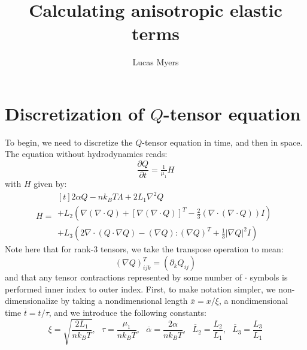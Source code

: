 \documentclass[reqno]{article}
\begin{document}
\title{Calculating anisotropic elastic terms}
\author{Lucas Myers}
\maketitle

\section{Discretization of $Q$-tensor equation}

To begin, we need to discretize the $Q$-tensor equation in time, and then in space.
The equation without hydrodynamics reads:
\begin{equation} \label{eq:Q-tensor-equation}
    \frac{\partial Q}{\partial t}
    =
    \tfrac{1}{\mu_1} H
\end{equation}
with $H$ given by:
\begin{equation}
    H
    =
    \begin{multlined}[t]
      2 \alpha Q - n k_B T \Lambda + 2 L_1 \nabla^2 Q \\
      + L_2 \left(
        \nabla \left( \nabla \cdot Q \right)
        + \left[ \nabla \left( \nabla \cdot Q \right) \right]^T
        - \tfrac23 \left( \nabla \cdot \left( \nabla \cdot Q \right) \right) I
      \right) \\
      + L_3 \left(
        2 \nabla \cdot \left( Q \cdot \nabla Q \right)
        - \left( \nabla Q \right) : \left( \nabla Q \right)^T
        + \tfrac13 \left| \nabla Q \right|^2 I
      \right)
    \end{multlined}
\end{equation}
Note here that for rank-3 tensors, we take the transpose operation to mean:
\begin{equation}
    \left( \nabla Q \right)^T_{ijk}
    =
    \left( \partial_k Q_{ij} \right)
\end{equation}
and that any tensor contractions represented by some number of $\cdot$ symbols is performed inner index to outer index.
First, to make notation simpler, we non-dimensionalize by taking a nondimensional length $\overline{x} = x / \xi$, a nondimensional time $\overline{t} = t / \tau$, and we introduce the following constants:
\begin{equation}
    \xi = \sqrt{\frac{2L_1}{n k_B T}}, \:\:\:
    \tau = \frac{\mu_1}{n k_B T}, \:\:\:
    \overline{\alpha} = \frac{2 \alpha}{n k_B T}, \:\:\:
    \overline{L}_2 = \frac{L_2}{L_1}, \:\:\:
    \overline{L}_3 = \frac{L_3}{L_1}
\end{equation}
\end{document}
